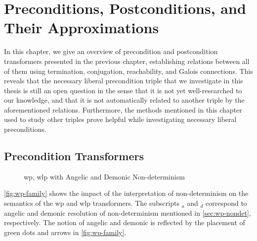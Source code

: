 \chapter{Preconditions, Postconditions, and Their Approximations}\label{ch:appr} %
In this chapter, we give an overview of precondition and postcondition transformers presented in the previous chapter, establishing relations between all of them using termination, conjugation, reachability, and Galois connections. 
This reveals that the necessary liberal precondition triple that we investigate in this thesis is still an open question in the sense that it is not yet well-researched to our knowledge, and that it is not automatically related to another triple by the aforementioned relations. 
Furthermore, the methods mentioned in this chapter used to study other triples prove helpful while investigating necessary liberal preconditions.   

\section{Precondition Transformers}
\begin{figure}[t]\centering
	\hfill

	\hfill
	\caption{wp, wlp with Angelic and Demonic Non-determinism}
	\label{fig:wp-family}
\end{figure}

\autoref{fig:wp-family} shows the impact of the interpretation of non-determinism on the semantics of the wp and wlp transformers. 
The subscripts $_a$ and $_d$ correspond to angelic and demonic resolution of non-determinism mentioned in \autoref{sec:wp-nondet}, respectively. 
The notion of angelic and demonic is reflected by the placement of green dots and arrows in \autoref{fig:wp-family}.

